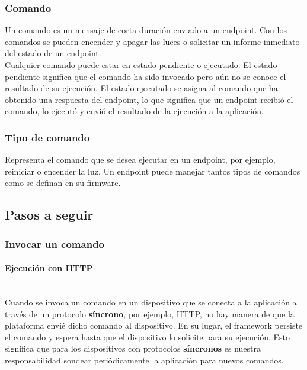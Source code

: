 {\subsubsection{Comando}

Un comando es un mensaje de corta duración enviado a un endpoint. Con los comandos se pueden encender y apagar las luces o solicitar un informe inmediato del estado de un endpoint.\\

Cualquier comando puede estar en estado pendiente o ejecutado. El estado pendiente significa que el comando ha sido invocado pero aún no se conoce el resultado de su ejecución. El estado ejecutado se asigna al comando que ha obtenido una respuesta del endpoint, lo que significa que un endpoint recibió el comando, lo ejecutó y envió el resultado de la ejecución a la aplicación.\\

\subsubsection{Tipo de comando}

Representa el comando que se desea ejecutar en un endpoint, por ejemplo, reiniciar o encender la luz. Un endpoint puede manejar tantos tipos de comandos como se definan en su firmware.

\subsection{Pasos a seguir}

\subsubsection{Invocar un comando}

\paragraph{Ejecución con HTTP}  \hspace{0pt} \\

Cuando se invoca un comando en un dispositivo que se conecta a la aplicación a través de un protocolo \textbf{síncrono}, por ejemplo, HTTP, no hay manera de que la plataforma envié dicho comando al dispositivo. En su lugar, el framework persiste el comando y espera hasta que el dispositivo lo solicite para su ejecución. Esto significa que para los dispositivos con protocolos \textbf{síncronos} es nuestra responsabilidad sondear periódicamente la aplicación para nuevos comandos. \\

}
